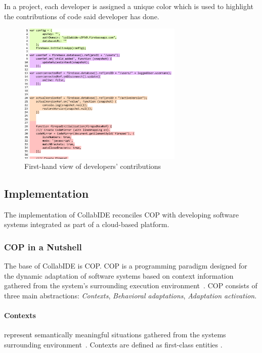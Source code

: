 In a project, each developer is assigned a unique color which is used to highlight the contributions of code said developer has done. 

\begin{figure}[htbp]
  \centering
  \includegraphics[width=0.7\textwidth]{img/fig2-collabIDEConcurrentProgramming}
  \caption{First-hand view of developers' contributions}
  \label{fig:layers}
\end{figure}


\subsection{Implementation}
\label{sec:implementation}

The implementation of CollabIDE reconciles \ac{COP} with developing software systems integrated as part of a cloud-based platform.

\subsubsection{\ac{COP} in a Nutshell}
The base of CollabIDE is \acf{COP}. \ac{COP} is a programming paradigm designed for the dynamic adaptation of software systems based on context information gathered from the system's surrounding execution environment~\cite{salvaneschi+12survey}. \ac{COP} consists of three main abstractions: \emph{Contexts}, \emph{Behavioral adaptations}, \emph{Adaptation activation}.

\paragraph{Contexts} represent semantically meaningful situations gathered from the systems surrounding environment~\cite{dey01}. Contexts are defined as first-class entities .

